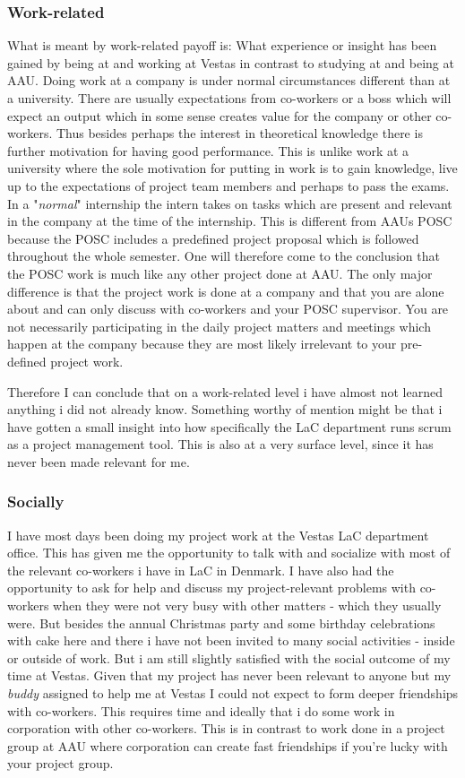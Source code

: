 \subsubsection{Work-related}
What is meant by work-related payoff is: What experience or insight has been gained by being at and working at Vestas in contrast to studying at and being at AAU. Doing work at a company is under normal circumstances different than at a university. There are usually expectations from co-workers or a boss which will expect an output which in some sense creates value for the company or other co-workers. Thus besides perhaps the interest in theoretical knowledge there is further motivation for having good performance. This is unlike work at a university where the sole motivation for putting in work is to gain knowledge, live up to the expectations of project team members and perhaps to pass the exams. In a "\textit{normal}" internship the intern takes on tasks which are present and relevant in the company at the time of the internship. This is different from AAUs POSC because the POSC includes a predefined project proposal which is followed throughout the whole semester. One will therefore come to the conclusion that the POSC work is much like any other project done at AAU. The only major difference is that the project work is done at a company and that you are alone about and can only discuss with co-workers and your POSC supervisor. You are not necessarily participating in the daily project matters and meetings which happen at the company because they are most likely irrelevant to your pre-defined project work.

Therefore I can conclude that on a work-related level i have almost not learned anything i did not already know. Something worthy of mention might be that i have gotten a small insight into how specifically the LaC department runs scrum as a project management tool. This is also at a very surface level, since it has never been made relevant for me.

\subsubsection{Socially}
I have most days been doing my project work at the Vestas LaC department office. This has given me the opportunity to talk with and socialize with most of the relevant co-workers i have in LaC in Denmark. I have also had the opportunity to ask for help and discuss my project-relevant problems with co-workers when they were not very busy with other matters - which they usually were. But besides the annual Christmas party and some birthday celebrations with cake here and there i have not been invited to many social activities - inside or outside of work. But i am still slightly satisfied with the social outcome of my time at Vestas. Given that my project has never been relevant to anyone but my \textit{buddy} assigned to help me at Vestas I could not expect to form deeper friendships with co-workers. This requires time and ideally that i do some work in corporation with other co-workers. This is in contrast to work done in a project group at AAU where corporation can create fast friendships if you're lucky with your project group.

